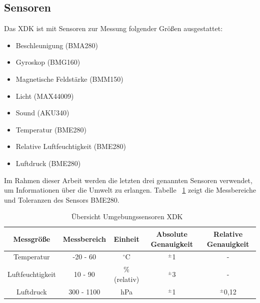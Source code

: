 \subsection{Sensoren}\label{subsec:Sensoren}
Das \acs*{XDK} ist mit Sensoren zur Messung folgender Größen ausgestattet:
\begin{itemize} 
	\item Beschleunigung (BMA280)
	\item Gyroskop (BMG160)
	\item Magnetische Feldstärke (BMM150)
	\item Licht (MAX44009)
	\item Sound (AKU340)
	\item Temperatur (BME280)
	\item Relative Luftfeuchtigkeit (BME280)
	\item Luftdruck (BME280)
\end{itemize}
Im Rahmen dieser Arbeit werden die letzten drei genannten Sensoren verwendet, um Informationen über die Umwelt zu erlangen. Tabelle ~\ref{tab:XDK Sensoren} zeigt die Messbereiche und Toleranzen des Sensors BME280.
\begin{table}[H]
	\begin{center}
		\begin{tabular}{|c|c|c|c|c|}
			\hline
			Messgröße & Messbereich & Einheit & Absolute Genauigkeit & Relative Genauigkeit  \\ \hline \hline
			
			Temperatur & -20 - 60 & $^\circ$C & $^\pm$1 & - \\ \hline 
			
			Luftfeuchtigkeit & 10 - 90 & \% (relativ) & $^\pm$3 & - \\ \hline 
			
			Luftdruck & 300 - 1100 & hPa & $^\pm$1 & $^\pm$0,12 \\ \hline 
			
		\end{tabular}
		
	\end{center}
	\caption{Übersicht Umgebungssensoren \acs{XDK} ~\cite{XDK.DataSheet}}
	\label{tab:XDK Sensoren}
\end{table}

